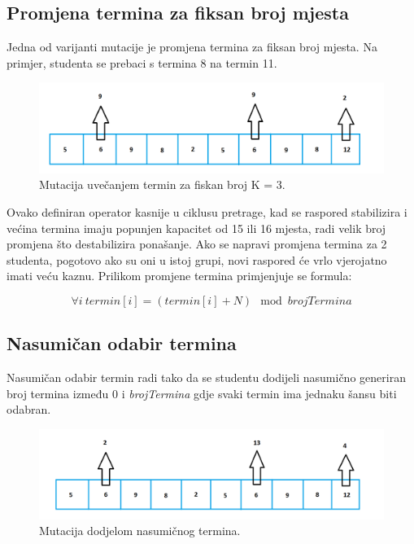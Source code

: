 \documentclass[times, utf8, zavrsni]{fer}
\begin{document}
\subsection{Promjena termina za fiksan broj mjesta}

Jedna od varijanti mutacije je promjena termina za fiksan broj mjesta. Na primjer, studenta se prebaci s termina 8 na termin 11.

\begin{figure}[htb]
\centering
\includegraphics[width=15cm]{images/mut_3.png}
\caption{Mutacija uvečanjem termin za fiskan broj K = 3.}
\label{fig:mut_3}
\end{figure}

Ovako definiran operator kasnije u ciklusu pretrage, kad se raspored stabilizira i većina termina imaju popunjen kapacitet od 15 ili 16 mjesta, radi velik broj promjena što destabilizira ponašanje. Ako se napravi promjena termina za 2 studenta, pogotovo ako su oni u istoj grupi, novi raspored će vrlo vjerojatno imati veću kaznu. Prilikom promjene termina primjenjuje se formula:

\begin{equation}
\forall i\ termin[i] = (termin[i] + N)\mod brojTermina
\label{eq:trans-kazne}
\end{equation}

\subsection{Nasumičan odabir termina}

Nasumičan odabir termin radi tako da se studentu dodijeli nasumično generiran broj termina između 0 i \emph{brojTermina} gdje svaki termin ima jednaku šansu biti odabran.

\begin{figure}[htb]
\centering
\includegraphics[width=15cm]{images/mut_rand.png}
\caption{Mutacija dodjelom nasumičnog termina.}
\label{fig:mut_rand}
\end{figure}
\end{document}
